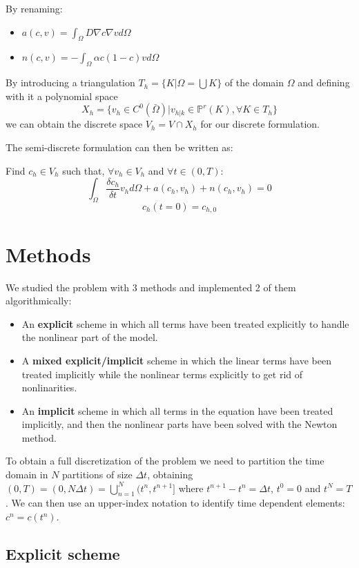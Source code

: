 \documentclass[12pt, letterpaper]{article}
\begin{document}
\vspace{1em}
\noindent By renaming:
\begin{itemize}
    \item $a(c,v)=\int_\Omega D\nabla c\nabla vd\Omega$
    \item $n(c,v)=-\int_\Omega\alpha c(1-c)vd\Omega$
\end{itemize}

\noindent By introducing a triangulation $T_h=\{K|\Omega=\bigcup K\}$ of the domain $\Omega$ and defining with it a polynomial space $$X_h=\{v_h\in C^0(\bar\Omega)|v_{h|k}\in\mathbb{P}^r(K),\forall K\in T_h\}$$ we can obtain the discrete space $V_h=V\cap X_h$ for our discrete formulation.

\noindent The semi-discrete formulation can then be written as:

\vspace{1em}
\noindent
Find $c_h\in V_h$ such that, $\forall v_h\in V_h$ and $\forall t\in(0,T)$:
$$\int_\Omega\frac{\delta c_h}{\delta t}v_hd\Omega+a(c_h,v_h)+n(c_h,v_h)=0$$
$$c_h(t=0)=c_{h,0}$$

\section{Methods}

We studied the problem with 3 methods and implemented 2 of them algorithmically:
\begin{itemize}
    \item An \textbf{explicit} scheme in which all terms have been treated explicitly to handle the nonlinear part of the model.
    \item A \textbf{mixed explicit/implicit} scheme in which the linear terms have been treated implicitly while the nonlinear terms explicitly to get rid of nonlinarities.
    \item An \textbf{implicit} scheme in which all terms in the equation have been treated implicitly, and then the nonlinear parts have been solved with the Newton method.
\end{itemize}

\noindent To obtain a full discretization of the problem we need to partition the time domain in $N$ partitions of size $\Delta t$, obtaining $(0, T)=(0,N\Delta t)=\bigcup_{n=1}^N(t^n, t^{n+1}]$ where $t^{n+1}-t^n=\Delta t$, $t^0=0$ and $t^N=T$. We can then use an upper-index notation to identify time dependent elements: $c^n = c(t^n)$.

\subsection{Explicit scheme}
\end{document}
